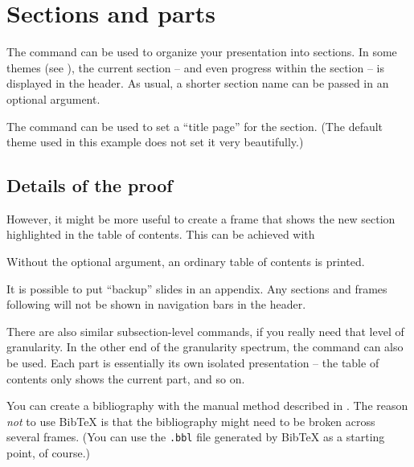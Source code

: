 
%
%
%
\section{Sections and parts}

The  command can be used to organize your presentation into sections.
In some themes (see ),
the current section -- and even progress within the section -- is displayed in the header.
As usual, a shorter section name can be passed in an optional argument.

The  command can be used to set a ``title page'' for the section.
(The default theme used in this example does not set it very beautifully.)
%
\begin{ExampleCode}
\section{Details of the proof}

\sectionpage
\end{ExampleCode}
%
\begin{center}
\end{center}

However, it might be more useful to create a frame that shows
the new section highlighted in the table of contents.
This can be achieved with
%
\begin{ExampleCode}
\begin{frame}
    \tableofcontents[currentsection]
\end{frame}
\end{ExampleCode}
%
Without the optional argument, an ordinary table of contents is printed.

It is possible to put ``backup'' slides in an appendix.
Any sections and frames following 
will not be shown in navigation bars in the header.

There are also similar subsection-level commands,
if you really need that level of granularity.
In the other end of the granularity spectrum,
the  command can also be used.
Each part is essentially its own isolated presentation
-- the table of contents only shows the current part, and so on.

You can create a bibliography with the manual method described in .
The reason \emph{not} to use BibTeX is that the bibliography
might need to be broken across several frames.
(You can use the \verb|.bbl| file generated by BibTeX as a starting point, of course.)

